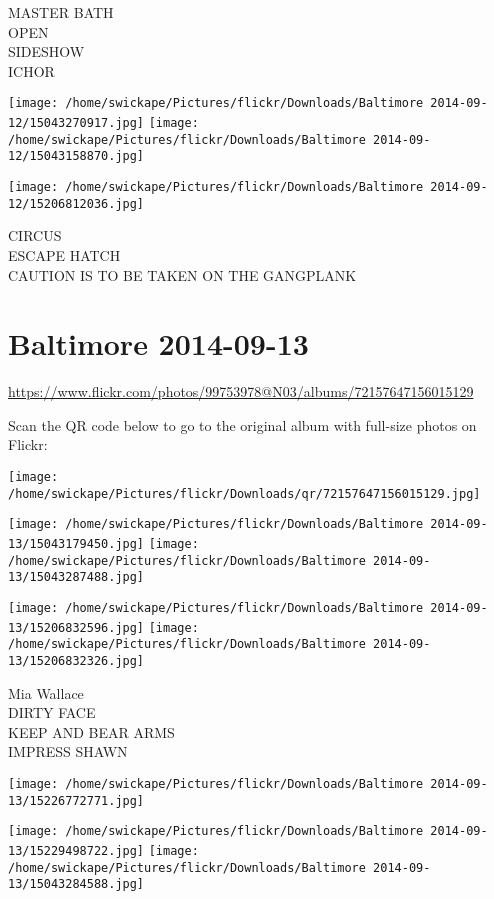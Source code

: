\documentclass[10pt,letterpaper]{article}
\begin{document}
MASTER BATH\\
OPEN\\
SIDESHOW\\
ICHOR
\pagebreak

\texttt{[image: /home/swickape/Pictures/flickr/Downloads/Baltimore 2014-09-12/15043270917.jpg]}
\texttt{[image: /home/swickape/Pictures/flickr/Downloads/Baltimore 2014-09-12/15043158870.jpg]}

\texttt{[image: /home/swickape/Pictures/flickr/Downloads/Baltimore 2014-09-12/15206812036.jpg]}

CIRCUS\\
ESCAPE HATCH\\
CAUTION IS TO BE TAKEN ON THE GANGPLANK
\pagebreak

\section*{Baltimore 2014-09-13}

\url{https://www.flickr.com/photos/99753978@N03/albums/72157647156015129}

Scan the QR code below to go to the original album with full-size photos on Flickr:

\texttt{[image: /home/swickape/Pictures/flickr/Downloads/qr/72157647156015129.jpg]}
\pagebreak

\texttt{[image: /home/swickape/Pictures/flickr/Downloads/Baltimore 2014-09-13/15043179450.jpg]}
\texttt{[image: /home/swickape/Pictures/flickr/Downloads/Baltimore 2014-09-13/15043287488.jpg]}

\texttt{[image: /home/swickape/Pictures/flickr/Downloads/Baltimore 2014-09-13/15206832596.jpg]}
\texttt{[image: /home/swickape/Pictures/flickr/Downloads/Baltimore 2014-09-13/15206832326.jpg]}

Mia Wallace\\
DIRTY FACE\\
KEEP AND BEAR ARMS\\
IMPRESS SHAWN
\pagebreak

\texttt{[image: /home/swickape/Pictures/flickr/Downloads/Baltimore 2014-09-13/15226772771.jpg]}

\vspace{0.25in}
\texttt{[image: /home/swickape/Pictures/flickr/Downloads/Baltimore 2014-09-13/15229498722.jpg]}
\texttt{[image: /home/swickape/Pictures/flickr/Downloads/Baltimore 2014-09-13/15043284588.jpg]}
\end{document}
